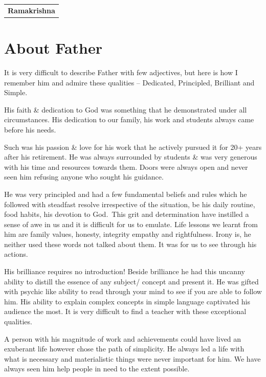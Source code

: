 \begin{flushright}
\begin{tabular}{c}
\textbf{Ramakrishna}
\end{tabular}
\end{flushright}
\bigskip

\section*{About Father}

It is very difficult to describe Father with few adjectives, but here is how I remember him and admire these qualities -- Dedicated, Principled, Brilliant and Simple.

His faith \& dedication to God was something that he demonstrated under all circumstances. His dedication to our family, his work and students always came before his needs.

Such was his passion \& love for his work that he actively pursued it for 20+ years after his retirement. He was always surrounded by students \& was very generous with his time and resources towards them. Doors were always open and never seen him refusing anyone who sought his guidance.

He was very principled and had a few fundamental beliefs and rules which he followed with steadfast resolve irrespective of the situation, be his daily routine, food habits, his devotion to God. This grit and determination have instilled a sense of awe in us and it is difficult for us to emulate. Life lessons we learnt from him are family values, honesty, integrity empathy and rightfulness. Irony is, he neither used these words not talked about them. It was for us to see through his actions.  

His brilliance requires no introduction! Beside brilliance he had this uncanny ability to distill the essence of any subject/ concept and present it. He was gifted with psychic like ability to read through your mind to see if you are able to follow him. His ability to explain complex concepts in simple language captivated his audience the most. It is very difficult to find a teacher with these exceptional qualities. 

A person with his magnitude of work and achievements could have lived an exuberant life however chose the path of simplicity. He always led a life with what is necessary and materialistic things were never important for him. We have always seen him help people in need to the extent possible. 

